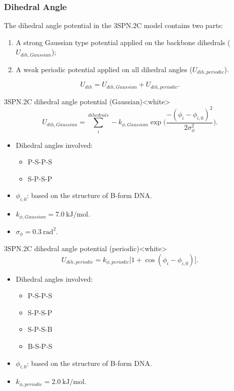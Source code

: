 \subsubsection{Dihedral Angle}
\label{sec:dna_3spn2c_potential_dihedral_angle}

The dihedral angle potential in the 3SPN.2C model contains two parts:
\begin{enumerate}
\item A strong Gaussian type potential applied on the backbone dihedrals
  ($U_{dih, Gaussian}$);
\item A weak periodic potential applied on all dihedral angles ($U_{dih, periodic}$).
\end{enumerate}
\begin{equation}
  \label{eq:dna_3spn2c_local_dihedral}
  U_{dih} = U_{dih, Gaussian} + U_{dih, periodic}.
\end{equation}

\begin{smallpage}{3SPN.2C dihedral angle potential (Gaussian)}<white>
  \begin{equation}
    \label{eq:dna_3spn2c_local_dihedral_Gaussian}
    U_{dih, Gaussian} = \sum_{i}^{dihedrals} -k_{ \phi, Gaussian } \exp\big( \frac{-(\phi_i - \phi_{i,0})^2}{2\sigma_{\phi}^2} \big).
  \end{equation}
  \tcblower
  \begin{itemize}
  \item Dihedral angles involved:
    \begin{itemize}
    \item P-S-P-S
    \item S-P-S-P
    \end{itemize}
  \item $\phi_{i, 0}$: based on the structure of B-form DNA.
  \item $k_{\phi, Gaussian} = 7.0\ \mathrm{kJ/mol}$.
  \item $\sigma_\phi = 0.3\ \mathrm{rad^2}$.
  \end{itemize}
\end{smallpage}

\begin{smallpage}{3SPN.2C dihedral angle potential (periodic)}<white>
  \begin{equation}
    \label{eq:dna_3spn2c_local_dihedral_periodic}
    U_{dih, periodic} = k_{\phi, periodic} \big[ 1+\cos(\phi_i - \phi_{ i,0 }) \big].
  \end{equation}
  \tcblower
  \begin{itemize}
  \item Dihedral angles involved:
    \begin{itemize}
    \item P-S-P-S
    \item S-P-S-P
    \item S-P-S-B
    \item B-S-P-S
    \end{itemize}
  \item $\phi_{i, 0}$: based on the structure of B-form DNA.
  \item $k_{\phi, periodic} = 2.0\ \mathrm{kJ/mol}$.
  \end{itemize}
\end{smallpage}


